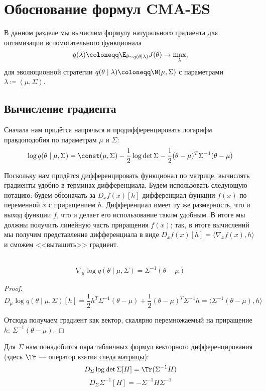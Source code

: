 \section{Обоснование формул CMA-ES}\label{appendix:cmaes}

В данном разделе мы вычислим формулу натурального градиента для оптимизации вспомогательного функционала
\begin{equation}\label{appendix_es}
g(\lambda) \coloneqq \E_{\theta \sim q(\theta \mid \lambda)} J(\theta) \to \max_{\lambda},
\end{equation}
для эволюционной стратегии $q(\theta \mid \lambda) \coloneqq \N(\mu, \Sigma)$ с параметрами $\lambda \coloneqq (\mu, \Sigma)$.

\subsection{Вычисление градиента}\label{cmaeslikelihoodgrads}

Сначала нам придётся напрячься и продифференцировать логарифм правдоподобия по параметрам $\mu$ и $\Sigma$:
$$\log q(\theta \mid \mu, \Sigma) = \const(\mu, \Sigma) - \frac{1}{2} \log \det \Sigma - \frac{1}{2}(\theta - \mu)^T\Sigma^{-1}(\theta - \mu)$$

Поскольку нам придётся дифференцировать функционал по матрице, вычислять градиенты удобно в терминах дифференциала. Будем использовать следующую нотацию: будем обозначать за $D_x f(x)[h]$ дифференциал функции $f(x)$ по переменной $x$ с приращением $h$. Дифференциал имеет ту же размерность, что и выход функции $f$, что и делает его использование таким удобным. В итоге мы должны получить линейную часть приращения $f(x)$; так, в итоге вычислений мы получим представление дифференциала в виде $D_x f(x)[h] = \langle \nabla_x f(x), h \rangle$ и сможем <<вытащить>> градиент.

\begin{proposition}\,
$$\nabla_\mu \log q(\theta \mid \mu, \Sigma) = \Sigma^{-1}(\theta - \mu)$$
\begin{proof}
$$D_\mu \log q(\theta \mid \mu, \Sigma)[h] = \frac{1}{2}h^T\Sigma^{-1}(\theta - \mu) + \frac{1}{2}(\theta - \mu)^T\Sigma^{-1}h = \langle \Sigma^{-1}(\theta - \mu), h \rangle$$

Отсюда получаем градиент как вектор, скалярно перемножаемый на приращение $h$: $\Sigma^{-1}(\theta - \mu)$.
\end{proof}
\end{proposition}

Для $\Sigma$ нам понадобится пара табличных формул векторного дифференцирования (здесь $\Tr$ --- оператор взятия \href{https://ru.wikipedia.org/wiki/\%D0\%A1\%D0\%BB\%D0\%B5\%D0\%B4_\%D0\%BC\%D0\%B0\%D1\%82\%D1\%80\%D0\%B8\%D1\%86\%D1\%8B}{следа матрицы}):
\begin{equation}\label{logdetdiff}
D_\Sigma \log \det \Sigma [H] = \Tr(\Sigma^{-1}H)
\end{equation}
\begin{equation}\label{inversediff}
D_\Sigma \Sigma^{-1} [H] = -\Sigma^{-1}H\Sigma^{-1}
\end{equation}

